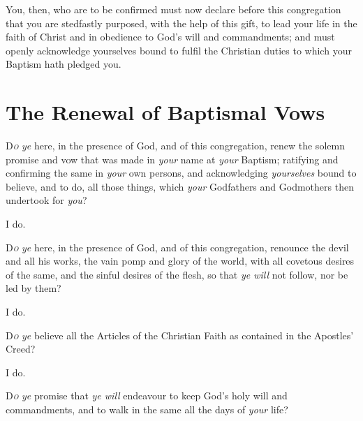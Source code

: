 You, then, who are to be confirmed must now declare before this congregation that you are stedfastly purposed, with the help of this gift, to lead your life in the faith of Christ and in obedience to God’s will and commandments; and must openly acknowledge yourselves bound to fulfil the Christian duties to which your Baptism hath pledged you.

\section{The Renewal of Baptismal Vows}

\centerline{}

\lettrine{D}{\emph{o}} \emph{ye} here, in the presence of God, and of this congregation, renew the solemn promise and vow that was made in \emph{your} name at \emph{your} Baptism; ratifying and confirming the same in \emph{your} own persons, and acknowledging \emph{yourselves} bound to believe, and to do, all those things, which \emph{your} Godfathers and Godmothers then undertook for \emph{you}?

\centerline{}
\centerline{I do.}

\medskip

\centerline{}
\lettrine{D}{\emph{o}} \emph{ye} here, in the presence of God, and of this congregation, renounce the devil and all his works, the vain pomp and glory of the world, with all covetous desires of the same, and the sinful desires of the flesh, so that \emph{ye will} not follow, nor be led by them?

\R I do.

\lettrine{D}{\emph{o}} \emph{ye} believe all the Articles of the Christian Faith as contained in the Apostles’ Creed?

\R I do.

\lettrine{D}{\emph{o}} \emph{ye} promise that \emph{ye will} endeavour to keep God’s holy will and commandments, and to walk in the same all the days of \emph{your} life?


